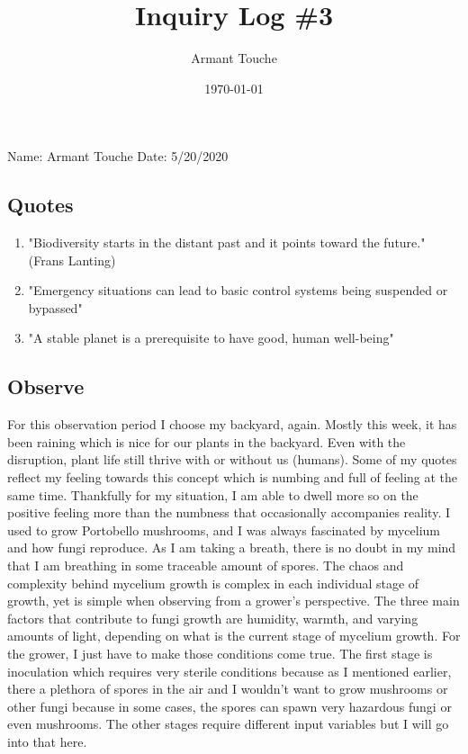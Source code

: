 \documentclass[a4paper,man,biblatex]{apa6}
\title{Inquiry Log \#3}
\author{Armant Touche}
\affiliation{Portland State University}
\date{\today}
\begin{document}
\thispagestyle{otherpage}
\setcounter{biburllcpenalty}{7000}
\setcounter{biburlucpenalty}{8000}


\noindent Name: Armant Touche\newline
\noindent Date: 5/20/2020

\subsection{Quotes}
\begin{enumerate}
    \item "Biodiversity starts in the distant past and it points toward the future." (Frans Lanting)
    \item "Emergency situations can lead to basic control systems being suspended or bypassed" \autocite{account_pan}
    \item "A stable planet is a prerequisite to have good, human well-being" \autocite{stable} 

\end{enumerate}

\subsection{Observe} For this observation period I choose my backyard, again. Mostly this week, it has been raining which is nice for our plants in the backyard. Even with the disruption, plant life still thrive with or without us (humans). Some of my quotes reflect my feeling towards this concept which is numbing and full of feeling at the same time. Thankfully for my situation, I am able to dwell more so on the positive feeling more than the numbness that occasionally accompanies reality. I used to grow Portobello mushrooms, and I was always fascinated by mycelium and how fungi reproduce. As I am taking a breath, there is no doubt in my mind that I am breathing in some traceable amount of spores. The chaos and complexity behind mycelium growth is complex in each individual stage of growth, yet is simple when observing from a grower's perspective. The three main factors that contribute to fungi growth are humidity, warmth, and varying amounts of light, depending on what is the current stage of mycelium growth. For the grower, I just have to make those conditions come true. The first stage is inoculation which requires very sterile conditions because as I mentioned earlier, there a plethora of spores in the air and I wouldn't want to grow mushrooms or other fungi because in some cases, the spores can spawn very hazardous fungi or even mushrooms. The other stages require different input variables but I will go into that here. 
\end{document}

